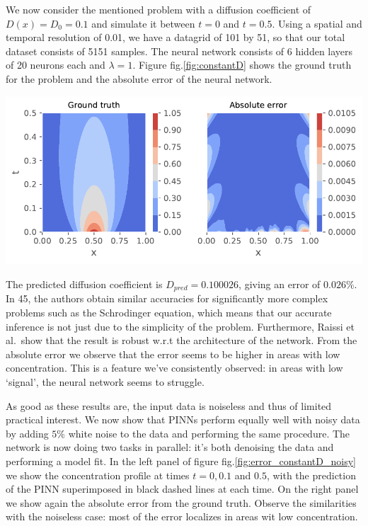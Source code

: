 \documentclass[12pt,a4paper,]{Dissertate}
\let\origfigure\figure
\let\endorigfigure\endfigure
\renewenvironment{figure}[1][2] {
    \expandafter\origfigure\expandafter[H]
} {
    \endorigfigure
}
\begin{document}
We now consider the mentioned problem with a diffusion coefficient of
\(D(x) = D_0 = 0.1\) and simulate it between \(t=0\) and \(t=0.5\).
Using a spatial and temporal resolution of 0.01, we have a datagrid of
101 by 51, so that our total dataset consists of 5151 samples. The
neural network consists of 6 hidden layers of 20 neurons each and
\(\lambda=1\). Figure fig.\ref{fig:constantD} shows the ground truth
for the problem and the absolute error of the neural network.

\begin{figure}
\hypertarget{fig:constantD}{%
\centering
\includegraphics{source/figures/pdf/error_constantD.pdf}
\caption{\textbf{Left panel}: Simulated ground truth of the problem.
\textbf{Right panel}: The absolute error of neural network. Note that
most of the error is located at areas with low concentration,
i.e.~signal.}\label{fig:constantD}
}
\end{figure}

The predicted diffusion coefficient is \(D_{pred} = 0.100026\), giving
an error of \(0.026\%\). In 45, the authors obtain similar accuracies
for significantly more complex problems such as the Schrodinger
equation, which means that our accurate inference is not just due to the
simplicity of the problem. Furthermore, Raissi et al.~show that the
result is robust w.r.t the architecture of the network. From the
absolute error we observe that the error seems to be higher in areas
with low concentration. This is a feature we've consistently observed:
in areas with low `signal', the neural network seems to struggle.

As good as these results are, the input data is noiseless and thus of
limited practical interest. We now show that PINNs perform equally well
with noisy data by adding \(5\%\) white noise to the data and performing
the same procedure. The network is now doing two tasks in parallel: it's
both denoising the data and performing a model fit. In the left panel of
figure fig.\ref{fig:error_constantD_noisy} we show the concentration
profile at times \(t = 0, 0.1\) and \(0.5\), with the prediction of the
PINN superimposed in black dashed lines at each time. On the right panel
we show again the absolute error from the ground truth. Observe the
similarities with the noiseless case: most of the error localizes in
areas wit low concentration.
\end{document}
